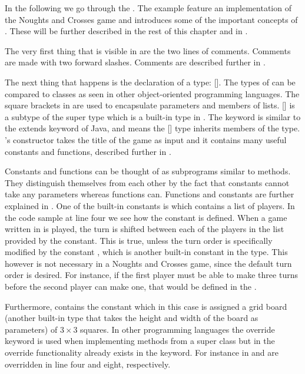 In the following we go through the . The example feature
an implementation of the Noughts and Crosses game and introduces some of the important concepts of \productname{}. These will be
further described in the rest of this chapter and in .

The very first thing that is visible in  are the
two lines of comments. Comments are made with two forward slashes. Comments are
described further in .

The next thing that happens is the declaration of a type: 
[].  The types of \productname{} can be compared to classes as
seen in other object-oriented programming languages. The square brackets in
\productname{} are used to encapsulate parameters and members
of lists.  [] is a subtype of the super type 
which is a built-in type in \productname{}. The  keyword is
similar to the extends keyword of Java, and means the [] type
inherits members of the  type.  's constructor takes the
title of the game as input and it contains many useful constants and
functions, described further in . 


Constants and functions can be thought of as subprograms similar to methods.
They distinguish themselves from each other by the fact that constants cannot
take any parameters whereas functions can. Functions and constants are further
explained in . One of the built-in constants is
 which contains a list of players. In the code sample at line
four we see how the constant is defined. When a game written in
\productname{} is played, the turn is shifted between each of the players in
the list provided by the  constant. This is true, unless the turn
order is specifically modified by the constant , which is
another built-in constant in the  type. This however is not necessary
in a Noughts and Crosses game, since the default turn order is desired. For instance,
if the first player must be able to make three turns before the second player
can make one, that would be defined in the .

Furthermore,  contains the constant  which in
this case is assigned a grid board (another built-in type that takes the height
and width of the board as parameters) of $3 \times 3$ squares. In other
programming languages the override keyword is used when implementing methods
from a super class but in \productname{} the override functionality 
already exists in the  keyword. For instance in
  and  are
overridden in line four and eight, respectively.

